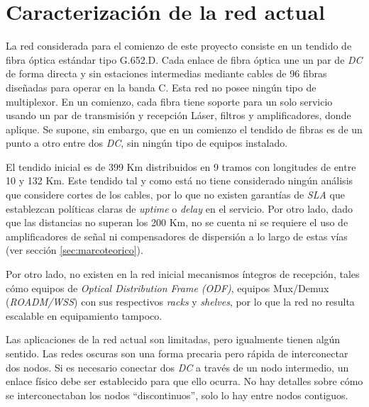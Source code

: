 \section{Caracterización de la red actual}
\label{sec:caracterizacion}

La red considerada para el comienzo de este proyecto consiste en un
tendido de fibra óptica estándar tipo G.652.D\cite{G652D}. Cada enlace
de fibra óptica une un par de \emph{DC} de forma directa y sin
estaciones intermedias mediante cables de 96 fibras diseñadas para
operar en la banda C. Esta red no posee ningún tipo de multiplexor.
En un comienzo, cada fibra tiene soporte para un solo servicio usando
un par de transmisión y recepción Láser, filtros y amplificadores,
donde aplique. Se supone, sin embargo, que en un comienzo el tendido
de fibras es de un punto a otro entre dos \emph{DC}, sin ningún tipo de
equipos instalado.

El tendido inicial es de 399 Km distribuidos en 9 tramos con longitudes
de entre 10 y 132 Km. Este tendido tal y como está no tiene considerado
ningún análisis que considere cortes de los cables, por lo que no 
existen garantías de \emph{SLA} que establezcan políticas claras de
\emph{uptime} o \emph{delay} en el servicio. Por otro lado, dado que
las distancias no superan los 200 Km, no se cuenta ni se requiere el
uso de amplificadores de señal ni compensadores de dispersión a lo 
largo de estas vías (ver sección \ref{sec:marcoteorico}).

Por otro lado, no existen en la red inicial mecanismos íntegros de
recepción, tales cómo equipos de \textit{Optical Distribution Frame
  (ODF)}, equipos Mux/Demux (\textit{ROADM/WSS}) con sus respectivos
\textit{racks} y \textit{shelves}, por lo que la red no resulta
escalable en equipamiento tampoco.

Las aplicaciones de la red actual son limitadas, pero igualmente
tienen algún sentido. Las redes oscuras son una forma precaria pero
rápida de interconectar dos nodos. Si es necesario conectar dos
\emph{DC} a través de un nodo intermedio, un enlace físico debe ser
establecido para que ello ocurra. No hay detalles sobre cómo se
interconectaban los nodos ``discontinuos'', solo lo hay entre nodos
contiguos.

